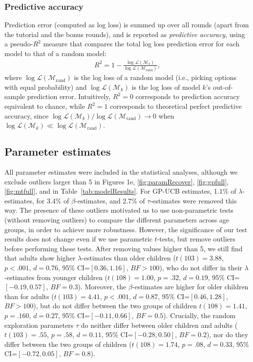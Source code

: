 \subsubsection*{Predictive accuracy}  
Prediction error (computed as log loss) is summed up over all rounds (apart from the tutorial and the bonus rounds), and is reported as \emph{predictive accuracy}, using a pseudo-$R^2$ measure that compares the total log loss prediction error for each model to that of a random model: 
\begin{align}
R^2=1-\frac{\log\mathcal{L}(\mathcal{M}_k)}{\log\mathcal{L}(\mathcal{M}_{\text{rand}})},
\end{align}
where $\log\mathcal{L}(\mathcal{M}_{\text{rand}})$ is the log loss of a random model (i.e., picking options with equal probability) and $\log\mathcal{L}(\mathcal{M}_k)$ is the log loss of model $k$'s out-of-sample prediction error. Intuitively, $R^2=0$ corresponds to prediction accuracy equivalent to chance, while $R^2=1$ corresponds to theoretical perfect predictive accuracy, since $\log\mathcal{L}(\mathcal{M}_k)/\log\mathcal{L}(\mathcal{M}_{\text{rand}}) \to 0$ when $\log\mathcal{L}(\mathcal{M}_k) \ll \log\mathcal{L}(\mathcal{M}_{\text{rand}})$. 





\subsection*{Parameter estimates}  

All parameter estimates were included in the statistical analyses, although we exclude outliers larger than 5 in Figures 1e, \ref{fig:paramRecover}, \ref{fig:gpfull}, \ref{fig:mtfull}, and in Table~\ref{tab:modelResults}. For GP-UCB estimates, 1.1\% of $\lambda$-estimates, for 3.4\% of $\beta$-estimates, and 2.7\% of $\tau$-estimates were removed this way. The presence of these outliers motivated us to use non-parametric tests (without removing outliers) to compare the different parameters across age groups, in order to achieve more robustness. However, the significance of our test results does not change even if we use parametric $t$-tests, but remove outliers before performing these tests. After removing values higher than 5, we still find that adults show higher $\lambda$-estimates than older children ($t(103)=3.88$, $p<.001$, $d=0.76$, 95\% CI=$[0.36,1.16]$, $BF>100$), who do not differ in their $\lambda$-estimates from younger children ($t(108)=1.00$, $p=.32$, $d=0.19$, 95\% CI=$[-0.19,0.57]$, $BF=0.3$). Moreover, the $\beta$-estimates are higher for older children than for adults ($t(103)=4.41$, $p<.001$, $d=0.87$, 95\% CI=$[0.46,1.28]$, $BF>100$), but do not differ between the two groups of children $t(108)=1.41$, $p=.160$, $d=0.27$, 95\% CI=$[-0.11,0.66]$, $BF=0.5$). Crucially, the random exploration parameters $\tau$ do neither differ between older children and adults ($t(103)=.55$, $p=.58$, $d=0.11$, 95\% CI=$[-0.28,0.50]$, $BF=0.2$), nor do they differ between the two groups of children ($t(108)=1.74$, $p=.08$, $d=0.33$, 95\% CI=$[-0.72,0.05]$, $BF=0.8$).


